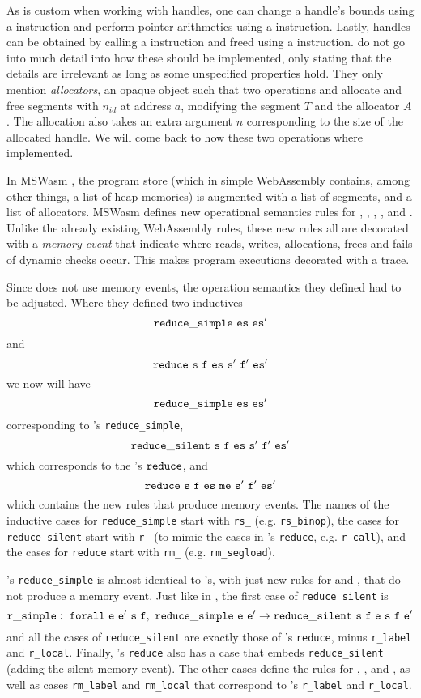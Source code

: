 \documentclass[a4paper]{article}
\begin{document}
As is custom when working with handles, one can change a handle's bounds using a \xxWslice instruction and perform pointer arithmetics using a \xxWhandleadd instruction. Lastly, handles can be obtained by calling a \xxWsegalloc instruction and freed using a \xxWsegfree instruction. \citet{mswasm} do not go into much detail into how these should be implemented, only stating that the details are irrelevant as long as some unspecified properties hold. They only mention \emph{allocators}, an opaque object such that two operations  and  allocate and free segments with \xxWid \( n_{id} \) at address \( a \), modifying the segment \( T \) and the allocator \( A \). The allocation also takes an extra argument \( n \) corresponding to the size of the allocated handle. We will come back to how these two operations where implemented.

In MSWasm \cite{mswasm}, the program store (which in simple WebAssembly contains, among other things, a list of heap memories) is augmented with a list of segments, and a list of allocators. MSWasm defines new operational semantics rules for \xxWsegload, \xxWsegstore, \xxWslice, \xxWhandleadd, \xxWsegalloc and \xxWsegfree. Unlike the already existing WebAssembly rules, these new rules all are decorated with a \emph{memory event} that indicate where reads, writes, allocations, frees and fails of dynamic checks occur. This makes program executions decorated with a trace.

Since \citet{iriswasm} does not use memory events, the operation semantics they defined had to be adjusted. Where they defined two inductives \[ \tt reduce\_simple~es~es' \] and \[ \tt reduce~s~f~es~s'~f'~es' \] we now will have \[ \tt reduce\_simple~es~es' \] corresponding to \iriswasm's {\tt reduce\_simple}, \[ \tt reduce\_silent~s~f~es~s'~f'~es' \] which corresponds to the \iriswasm's \( \tt reduce \), and \[ \tt reduce~s~f~es~me~s'~f'~es' \] which contains the new rules that produce memory events. The names of the inductive cases for {\tt reduce\_simple} start with {\tt rs\_} (e.g. {\tt rs\_binop}), the cases for {\tt reduce\_silent} start with {\tt r\_} (to mimic the cases in \iriswasm's {\tt reduce}, e.g. {\tt r\_call}), and the cases for {\tt reduce} start with {\tt rm\_} (e.g. {\tt rm\_segload}).


\irismswasm's {\tt reduce\_simple} is almost identical to \iriswasm's, with just new rules for \xxWhandleadd and \xxWslice, that do not produce a memory event. Just like in \iriswasm, the first case of {\tt reduce\_silent} is \[ \tt r\_simple:~forall~e~e'~s~f,~reduce\_simple~e~e'\to reduce\_silent~s~f~e~s~f~e' \] and all the cases of {\tt reduce\_silent} are exactly those of \iriswasm's {\tt reduce}, minus {\tt r\_label} and {\tt r\_local}. Finally, \irismswasm's {\tt reduce} also has a case that embeds {\tt reduce\_silent} (adding the silent \xxCMEempty memory event). The other cases define the rules for \xxWsegload, \xxWsegstore, \xxWsegalloc and \xxWsegfree, as well as cases {\tt rm\_label} and {\tt rm\_local} that correspond to \iriswasm's {\tt r\_label} and {\tt r\_local}.
\end{document}
